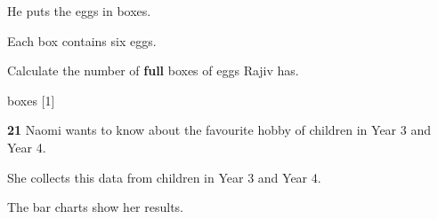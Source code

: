 \documentclass[12pt]{article}
\newcommand{\QuestionMarks}[1]{\hfill [#1]}
\newcommand{\AnswerLine}[1]{\makebox[#1]{\hrulefill}}
\begin{document}
	\vspace{0.25cm}
	
	He puts the eggs in boxes.
	
	Each box contains six eggs.
	
	\vspace{0.35cm}
	
	Calculate the number of \textbf{full} boxes of eggs Rajiv has.
	
	\vspace{0.6cm}
	
	\hfill \AnswerLine{4.5cm}\quad boxes \QuestionMarks{1}
	
	\vspace{0.8cm}
	
	\textbf{21}\quad
	Naomi wants to know about the favourite hobby of children in Year 3 and Year 4.
	
	She collects this data from children in Year 3 and Year 4.
	
	\vspace{0.3cm}
	
	The bar charts show her results.
	
	\vspace{0.25cm}
	
\end{document}
